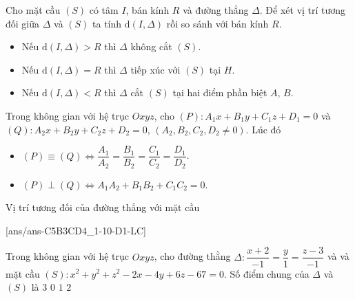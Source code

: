 \begin{tomtat}
\begin{center}
\end{center}
Cho mặt cầu $(S)$ có tâm $I$, bán kính $R$ và đường thẳng $\Delta$. Để xét vị trí tương đối giữa $\Delta$ và $(S)$ ta tính $\mathrm{d}\left(I,\Delta\right)$ rồi so sánh với bán kính $R$.
\begin{itemize}
	\item Nếu $\mathrm{d}\left(I,\Delta\right)>R$ thì $\Delta$ không cắt $(S)$.
	\item Nếu $\mathrm{d}\left(I,\Delta\right)=R$ thì $\Delta$ tiếp xúc với $(S)$ tại $H$.
	\item Nếu $\mathrm{d}\left(I,\Delta\right)<R$ thì $\Delta$ cắt $(S)$ tại hai điểm phần biệt $A$, $B$.
\end{itemize}
\begin{note}
	Trong không gian với hệ trục $Oxyz$, cho $(P)\colon A_1x+B_1y+C_1z+D_1=0$ và $(Q)\colon A_2x+B_2y+C_2z+D_2=0,\,(A_2,B_2,C_2,D_2\ne 0)$. Lúc đó
	\begin{itemize}
		\item $(P) \equiv (Q) \Leftrightarrow \dfrac{A_1}{A_2}=\dfrac{B_1}{B_2}=\dfrac{C_1}{C_2}=\dfrac{D_1}{D_2}$.
		\item  $(P) \perp(Q) \Leftrightarrow A_1 A_2+B_1 B_2+C_1 C_2=0$.
	\end{itemize} 
\end{note}
\end{tomtat}
\begin{dang}{Vị trí tương đối của đường thẳng với mặt cầu}
\end{dang}

\TN
{}[ans/ans-C5B3CD4_1-10-D1-LC]
\begin{ex}%
	Trong không gian với hệ trục $Oxyz$, cho đường thằng $\Delta\colon \dfrac{x+2}{-1}=\dfrac{y}{1}=\dfrac{z-3}{-1}$ và và mặt cầu $(S)\colon x^2+y^2+z^2-2 x-4 y+6 z-67=0$. Số điểm chung của $\Delta$ và $(S)$ là \choice
		{$3$}
		{$0$}
		{$1$}
		{\True $2$}
\end{ex}

